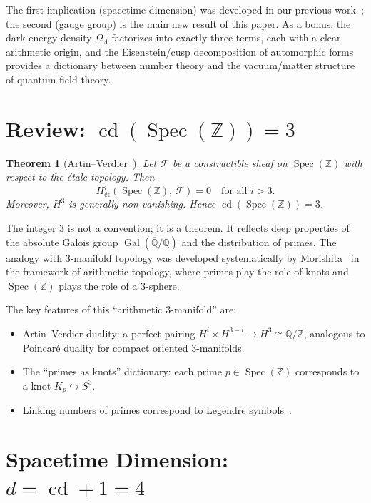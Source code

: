 \documentclass[12pt,a4paper]{article}
\newtheorem{theorem}{Theorem}[section]
\theoremstyle{definition}
\newcommand{\Spec}{\operatorname{Spec}}
\newcommand{\cd}{\operatorname{cd}}
\newcommand{\Gal}{\operatorname{Gal}}
\newcommand{\Q}{\mathbb{Q}}
\newcommand{\Z}{\mathbb{Z}}
\newcommand{\OmL}{\Omega_\Lambda}
\begin{document}
The first implication (spacetime dimension) was developed in our previous
work~\cite{WB_spacetime}; the second (gauge group) is the main new result
of this paper.
As a bonus, the dark energy density $\OmL$ factorizes into exactly
three terms, each with a clear arithmetic origin, and the
Eisenstein/cusp decomposition of automorphic forms provides
a dictionary between number theory and the vacuum/matter structure
of quantum field theory.

\section{Review: $\cd(\Spec(\Z))=3$}\label{sec:review}

\begin{theorem}[Artin--Verdier~\cite{ArtinVerdier}]
Let $\mathscr{F}$ be a constructible sheaf on $\Spec(\Z)$ with respect
to the \'etale topology.  Then
\[
  H^i_{\text{\'et}}(\Spec(\Z),\,\mathscr{F}) = 0
  \quad\text{for all } i > 3.
\]
Moreover, $H^3$ is generally non-vanishing.  Hence
$\cd(\Spec(\Z))=3$.
\end{theorem}

The integer $3$ is not a convention; it is a theorem.
It reflects deep properties of the absolute Galois group
$\Gal(\overline{\Q}/\Q)$ and the distribution of primes.
The analogy with $3$-manifold topology was developed systematically
by Morishita~\cite{Morishita} in the framework of arithmetic topology,
where primes play the role of knots and $\Spec(\Z)$ plays the role
of a $3$-sphere.

The key features of this ``arithmetic $3$-manifold'' are:
\begin{itemize}
  \item Artin--Verdier duality: a perfect pairing
    $H^i \times H^{3-i} \to H^3 \cong \Q/\Z$, analogous to
    Poincar\'e duality for compact oriented $3$-manifolds.
  \item The ``primes as knots'' dictionary: each prime
    $p \in \Spec(\Z)$ corresponds to a knot
    $K_p \hookrightarrow S^3$.
  \item Linking numbers of primes correspond to Legendre
    symbols~\cite{Morishita}.
\end{itemize}

\section{Spacetime Dimension: $d = \cd + 1 = 4$}\label{sec:spacetime}
\end{document}
